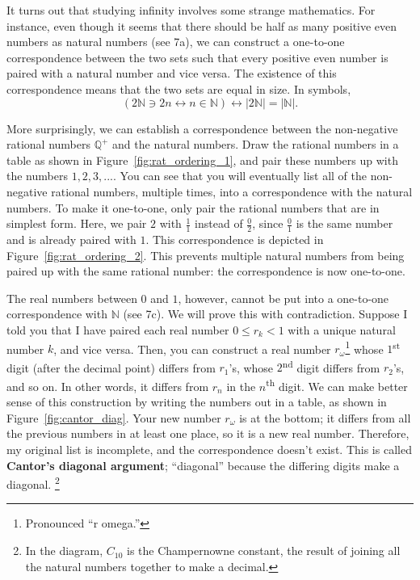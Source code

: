 \documentclass[../gatm.tex]{subfiles}
\begin{document}
It turns out that studying infinity involves some strange mathematics. For instance, even though it seems that there should be half as many positive even numbers as natural numbers (see 7a), we can construct a one-to-one correspondence between the two sets such that every positive even number is paired with a natural number and vice versa. The existence of this correspondence means that the two sets are equal in size. In symbols, $$(2\mathbb{N} \ni 2n \leftrightarrow n \in \mathbb{N}) \leftrightarrow |2\mathbb{N}|=|\mathbb{N}|.$$ %

More surprisingly, we can establish a correspondence between the non-negative rational numbers $\mathbb{Q}^+$ and the natural numbers. Draw the rational numbers in a table as shown in Figure~\ref{fig:rat_ordering_1}, and pair these numbers up with the numbers $1,2,3,$.... You can see that you will eventually list all of the non-negative rational numbers, multiple times, into a correspondence with the natural numbers. To make it one-to-one, only pair the rational numbers that are in simplest form. Here, we pair $2$ with $\frac{1}{1}$ instead of $\frac{0}{2}$, since $\frac{0}{1}$ is the same number and is already paired with $1$. This correspondence is depicted in Figure~\ref{fig:rat_ordering_2}. This prevents multiple natural numbers from being paired up with the same rational number: the correspondence is now one-to-one.

The real numbers between $0$ and $1$, however, cannot be put into a one-to-one correspondence with $\mathbb{N}$ (see 7c). We will prove this with contradiction. Suppose I told you that I have paired each real number $0 \leq r_k < 1$ with a unique natural number $k$, and vice versa. Then, you can construct a real number $r_\omega$\footnote{Pronounced ``r omega.''} whose $1$\textsuperscript{st} digit (after the decimal point) differs from $r_1$’s, whose $2$\textsuperscript{nd} digit differs from $r_2$’s, and so on. In other words, it differs from $r_n$ in the $n$\textsuperscript{th} digit. We can make better sense of this construction by writing the numbers out in a table, as shown in Figure~\ref{fig:cantor_diag}. Your new number $r_\omega$ is at the bottom; it differs from all the previous numbers in at least one place, so it is a new real number. Therefore, my original list is incomplete, and the correspondence doesn’t exist. This is called \textbf{Cantor’s diagonal argument}; ``diagonal'' because the differing digits make a diagonal. \footnote{In the diagram, $C_{10}$ is the Champernowne constant, the result of joining all the natural numbers together to make a decimal.} %
\end{document}
